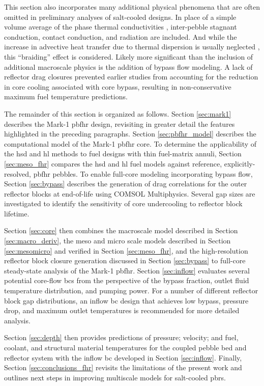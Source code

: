 This section also incorporates many additional physical phenomena that are often omitted in preliminary analyses of salt-cooled designs. In place of a simple volume average of the phase thermal conductivities \cite{xin_wang_thesis,scarlat}, inter-pebble stagnant conduction, contact conduction, and radiation are included. And while the increase in advective heat transfer due to thermal dispersion is usually neglected \cite{xin_wang_thesis,scarlat}, this ``braiding'' effect is considered. Likely more significant than the inclusion of additional macroscale physics is the addition of bypass flow modeling. A lack of reflector drag closures prevented earlier studies from accounting for the reduction in core cooling associated with core bypass, resulting in non-conservative maximum fuel temperature predictions.

The remainder of this section is organized as follows. Section \ref{sec:mark1} describes the Mark-1 \gls{pbfhr} design, revisiting in greater detail the features highlighted in the preceding paragraphs. Section \ref{sec:pbfhr_model} describes the computational model of the Mark-1 \gls{pbfhr} core. To determine the applicability of the \gls{hsd} and \gls{hl} methods to fuel designs with thin fuel-matrix annuli, Section \ref{sec:meso_fhr} compares the \gls{hsd} and \gls{hl} fuel models against reference, explicitly-resolved, \gls{pbfhr} pebbles. To enable full-core modeling incorporating bypass flow, Section \ref{sec:bypass} describes the generation of drag correlations for the outer reflector blocks at end-of-life using COMSOL Multiphysics. Several gap sizes are investigated to identify the sensitivity of core undercooling to reflector block lifetime. 

Section \ref{sec:core} then combines the macroscale model described in Section \ref{sec:macro_deriv}, the meso and micro scale models described in Section \ref{sec:mesomicro} and verified in Section \ref{sec:meso_fhr}, and the high-resolution reflector block closure generation discussed in Section \ref{sec:bypass} to full-core steady-state analysis of the Mark-1 \gls{pbfhr}. Section \ref{sec:inflow} evaluates several potential core-flow \glspl{bc} from the perspective of the bypass fraction, outlet fluid temperature distribution, and pumping power. For a number of different reflector block gap distributions, an inflow \gls{bc} design that achieves low bypass, pressure drop, and maximum outlet temperatures is recommended for more detailed analysis.

Section \ref{sec:depth} then provides predictions of pressure; velocity; and fuel, coolant, and structural material temperatures for the coupled pebble bed and reflector system with the inflow \gls{bc} developed in Section \ref{sec:inflow}. Finally, Section \ref{sec:conclusions_fhr} revisits the limitations of the present work and outlines next steps in improving multiscale models for salt-cooled \glspl{pbr}.


